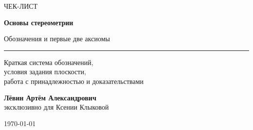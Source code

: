 \documentclass[a4paper,12pt]{article}
\begin{document}

\begin{titlepage}
\thispagestyle{empty}

\centering

\vspace*{25mm}

{\Large\textcolor{softgray}{ЧЕК-ЛИСТ}\par}

\vspace{10mm}

{\fontsize{26}{31}\selectfont
\bfseries
\textcolor{darkaccent}{
Основы стереометрии
}\par}

\vspace{3mm}

{\Large
Обозначения и первые две аксиомы
\par}

\vspace{14mm}

{\color{accent!70}\rule{0.46\linewidth}{0.8pt}\par}

\vspace{14mm}

{\large
Краткая система обозначений,\\
условия задания плоскости,\\
работа с принадлежностью и доказательствами
\par}

\vfill

{\large
\textbf{Лёвин Артём Александрович}\\[2mm]
эксклюзивно для Ксении Клыковой
\par}

\vspace{8mm}

{\large \today\par}

\vfill


\vspace{4mm}

\end{titlepage}
\end{document}
